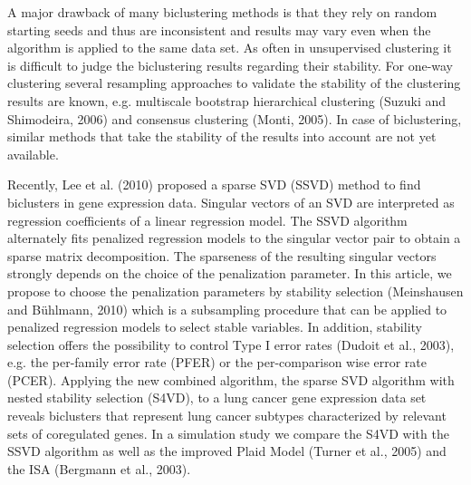\documentclass{bioinfo}
\begin{document}
A major drawback of many biclustering methods is that they rely on random starting seeds and thus are inconsistent and results may vary even when the algorithm is applied to the same data set. As often in unsupervised clustering it is difficult to judge the biclustering results regarding their stability. For one-way clustering several resampling approaches to validate the stability of the clustering results are known, e.g. %
multiscale bootstrap hierarchical clustering (Suzuki and Shimodeira, 2006)\nocite{Suzuki2006} and consensus clustering (Monti, 2005)\nocite{Monti2003}. In case of biclustering, similar methods that take the stability of the results into account are not yet available. 

Recently, Lee et al. (2010)\nocite{Lee2010} proposed a sparse SVD (SSVD) method to find biclusters in gene expression data. Singular vectors of an SVD are interpreted as regression coefficients of a linear regression model. The SSVD algorithm alternately fits penalized regression models to the singular vector pair to obtain a sparse matrix decomposition. The sparseness of the resulting singular vectors strongly depends on the choice of the penalization parameter. In this article, we propose to choose the penalization parameters by stability selection (Meinshausen and B\"uhlmann, 2010)\nocite{Meinshausen2010} which is a subsampling procedure that can be applied to penalized regression models to select stable variables. In addition, stability selection offers the possibility to control Type I error rates (Dudoit et al., 2003)\nocite{Dudoit2003}, e.g. the per-family error rate (PFER) or the per-comparison wise error rate (PCER). 
Applying the new combined algorithm, the sparse SVD algorithm with nested stability selection (S4VD), to a lung cancer gene expression data set reveals biclusters that represent lung cancer subtypes characterized by relevant sets of coregulated genes. In a simulation study we compare the S4VD with the SSVD algorithm as well as the improved Plaid Model (Turner et al., 2005) and the ISA (Bergmann et al., 2003).
\vspace{- .15 cm}
\end{document}
